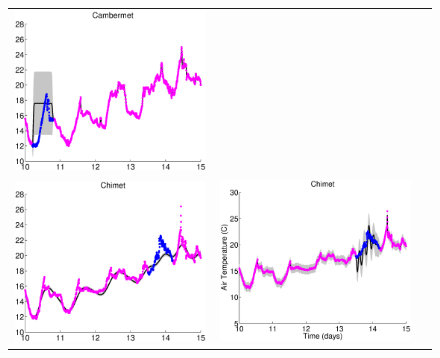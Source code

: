 \begin{figure}
\begin{tabular}{ccc}
\includegraphics[scale=0.3]{figures/weatherCambermet.eps}
\\
\includegraphics[scale=0.3]{figures/slfm-weatherChimet.eps} &
\includegraphics[scale=0.3]{figures/cgp-weatherChimet.eps} &

\end{tabular}
\end{figure}
